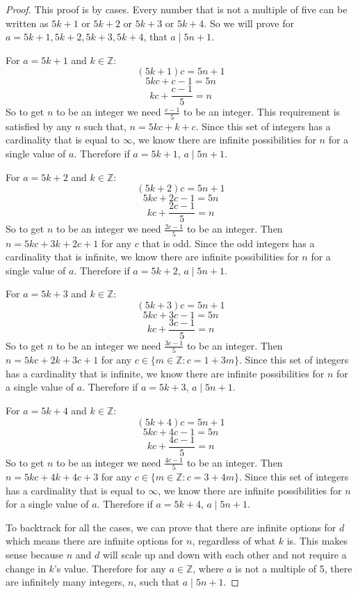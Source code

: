 \documentclass{article}
\begin{document}
\begin{proof}
This proof is by cases. Every number that is not a multiple of five can be written as $5k+1$ or $5k+2$ or $5k+3$ or $5k+4$. So we will prove for $a=5k+1,5k+2,5k+3,5k+4$, that $a\mid5n+1$. 

\vspace{5mm}

For $a=5k+1$ and $k\in\mathbb{Z}$:
$$(5k+1)c=5n+1$$
$$5kc+c-1=5n$$
$$kc+\frac{c-1}{5}=n$$
So to get $n$ to be an integer we need $\frac{c-1}{5}$ to be an integer. This requirement is satisfied by any $n$ such that, $n=5kc+k+c$. Since this set of integers has a cardinality that is equal to $\infty$, we know there are infinite possibilities for $n$ for a single value of $a$. Therefore if $a=5k+1$, $a\mid5n+1$.

\vspace{5mm}

For $a=5k+2$ and $k\in\mathbb{Z}$: 
$$(5k+2)c=5n+1$$
$$5kc+2c-1=5n$$
$$kc+\frac{2c-1}{5}=n$$
So to get $n$ to be an integer we need $\frac{2c-1}{5}$ to be an integer. Then $n=5kc+3k+2c+1$ for any $c$ that is odd.  Since the odd integers has a cardinality that is infinite, we know there are infinite possibilities for $n$ for a single value of $a$. Therefore if $a=5k+2$, $a\mid5n+1$.


\vspace{5mm}

For $a=5k+3$ and $k\in\mathbb{Z}$: 
$$(5k+3)c=5n+1$$
$$5kc+3c-1=5n$$
$$kc+\frac{3c-1}{5}=n$$
So to get $n$ to be an integer we need $\frac{3c-1}{5}$ to be an integer.
Then $n=5kc+2k+3c+1$ for any $c\in\{m\in\mathbb{Z}:c=1+3m\}$.  Since this set of integers has a cardinality that is infinite, we know there are infinite possibilities for $n$ for a single value of $a$. Therefore if $a=5k+3$, $a\mid5n+1$.

\vspace{5mm}

For $a=5k+4$ and $k\in\mathbb{Z}$: 
$$(5k+4)c=5n+1$$
$$5kc+4c-1=5n$$
$$kc+\frac{4c-1}{5}=n$$
So to get $n$ to be an integer we need $\frac{4c-1}{5}$ to be an integer. Then $n=5kc+4k+4c+3$ for any $c\in\{m\in\mathbb{Z}:c=3+4m\}$.  Since this set of integers has a cardinality that is equal to $\infty$, we know there are infinite possibilities for $n$ for a single value of $a$. Therefore if $a=5k+4$, $a\mid5n+1$.

\vspace{5mm}

To backtrack for all the cases, we can prove that there are infinite options for $d$ which means there are infinite options for $n$, regardless of what $k$ is. This makes sense because $n$ and $d$ will scale up and down with each other and not require a change in $k$'s value. Therefore for any $a\in\mathbb{Z}$, where $a$ is not a multiple of 5, there are infinitely many integers, $n$, such that $a\mid5n+1$.
\end{proof}
\end{document}
